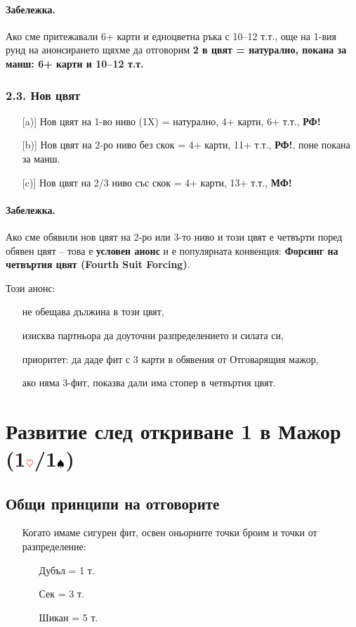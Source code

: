 \documentclass[10pt,a5paper]{extarticle}
\newcommand{\Rheart}{\textcolor{red}{\heartsuit}}
\newcommand{\Bspade}{\textcolor{black}{\spadesuit}}
\begin{document}
\paragraph{Забележка.}  
Ако сме притежавали 6+ карти и едноцветна ръка с 10–12 т.т., още на 1-вия рунд на анонсирането щяхме да отговорим \textbf{2 в цвят = натурално, покана за манш: 6+ карти и 10–12 т.т.}

\subsubsection*{2.3. Нов цвят}
\begin{itemize}
  \item[][a)] Нов цвят на 1-во ниво (1X) = натурално, 4+ карти, 6+ т.т., \textbf{РФ!}
  \item[][b)] Нов цвят на 2-ро ниво без скок = 4+ карти, 11+ т.т., \textbf{РФ!}, поне покана за манш.
  \item[][c)] Нов цвят на 2/3 ниво със скок = 4+ карти, 13+ т.т., \textbf{МФ!}
\end{itemize}

\paragraph{Забележка.}  
Ако сме обявили нов цвят на 2-ро или 3-то ниво и този цвят е четвърти поред обявен цвят – това е \textbf{условен анонс} и е популярната конвенция:  
\textbf{Форсинг на четвъртия цвят (Fourth Suit Forcing)}.  

Този анонс:
\begin{itemize}
  \item[] не обещава дължина в този цвят,
  \item[] изисква партньора да доуточни разпределението и силата си,
  \item[] приоритет: да даде фит с 3 карти в обявения от Отговарящия мажор,
  \item[] ако няма 3-фит, показва дали има стопер в четвъртия цвят.
\end{itemize}
\newpage
\section{Развитие след откриване 1 в Мажор (1$\Rheart$/1$\Bspade$)}

\subsection*{Общи принципи на отговорите}
\begin{itemize}
  \item[] Когато имаме сигурен фит, освен оньорните точки броим и точки от разпределение:
  \begin{itemize}
    \item[] Дубъл = 1 т.
    \item[] Сек = 3 т.
    \item[] Шикан = 5 т.
  \end{itemize}
\end{itemize}
\end{document}
